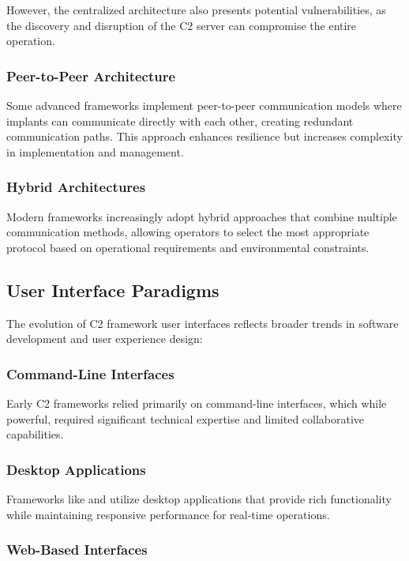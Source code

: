 However, the centralized architecture also presents potential vulnerabilities, as the discovery and disruption of the C2 server can compromise the entire operation.

\subsubsection{Peer-to-Peer Architecture}

Some advanced frameworks implement peer-to-peer communication models where implants can communicate directly with each other, creating redundant communication paths. This approach enhances resilience but increases complexity in implementation and management.

\subsubsection{Hybrid Architectures}

Modern frameworks increasingly adopt hybrid approaches that combine multiple communication methods, allowing operators to select the most appropriate protocol based on operational requirements and environmental constraints.

\subsection{User Interface Paradigms}
\label{subsec:ui_paradigms}

The evolution of C2 framework user interfaces reflects broader trends in software development and user experience design:

\subsubsection{Command-Line Interfaces}

Early C2 frameworks relied primarily on command-line interfaces, which while powerful, required significant technical expertise and limited collaborative capabilities.

\subsubsection{Desktop Applications}

Frameworks like  and  utilize desktop applications that provide rich functionality while maintaining responsive performance for real-time operations.

\subsubsection{Web-Based Interfaces}

